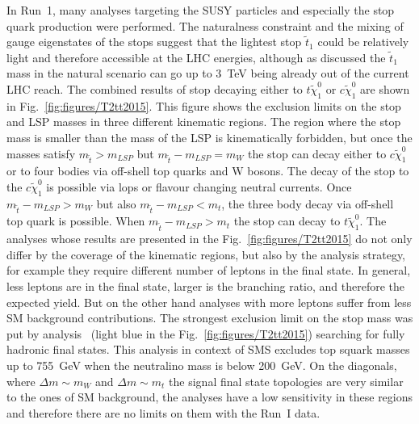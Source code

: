 In Run~1, many analyses targeting the SUSY particles and especially the stop quark production were performed. The naturalness constraint and the mixing of gauge eigenstates of the stops suggest that the lightest stop $\tilde{t}_{1}$ could be relatively light and therefore accessible at the LHC energies, although as discussed the $\tilde{t}_{1}$ mass in the natural scenario can go up to 3~TeV being already out of the current LHC reach. The combined results of stop decaying either to $t \tilde{\chi}_{1}^0$ or $c \tilde{\chi}_{1}^0$ are shown in Fig.~\ref{fig:figures/T2tt2015}. This figure shows the exclusion limits on the stop and LSP masses in three different kinematic regions. The region where the stop mass is smaller than the mass of the LSP is kinematically forbidden, but once the masses satisfy $m_{\tilde{t}} > m_{LSP}$ but $m_{\tilde{t}} - m_{LSP} = m_{W}$ the stop can decay either to $c \tilde{\chi}_{1}^0$ or to four bodies via off-shell top quarks and W bosons. The decay of the stop to the $c \tilde{\chi}_{1}^0$ is possible via lops or flavour changing neutral currents.  Once  $m_{\tilde{t}} - m_{LSP} > m_{W}$ but also  $m_{\tilde{t}} - m_{LSP} < m_{t}$, the three body decay via off-shell top quark is possible. When  $m_{\tilde{t}} - m_{LSP} > m_{t}$  the stop can decay to $t \tilde{\chi}_{1}^0$. The analyses whose results are presented in the Fig.~\ref{fig:figures/T2tt2015} do not only differ by the coverage of the kinematic regions, but also by the analysis strategy, for example they require different number of leptons in the final state. In general, less leptons are in the final state, larger is the branching ratio, and therefore the expected yield. But on the other hand analyses with more leptons suffer from less SM background contributions.  The strongest exclusion limit on the stop mass was put by analysis~\cite{Khachatryan:2016oia} (light blue in the Fig.~\ref{fig:figures/T2tt2015}) searching for fully hadronic final states. This analysis in context of SMS excludes top squark masses up to 755~GeV when the neutralino mass is below 200~GeV. On the diagonals, where $\Delta m \sim m_{W}$ and $\Delta m \sim m_{t}$ the signal final state topologies are very similar to the ones of SM background, the analyses have a low sensitivity in these regions and therefore there are no limits on them with the Run~I data.


